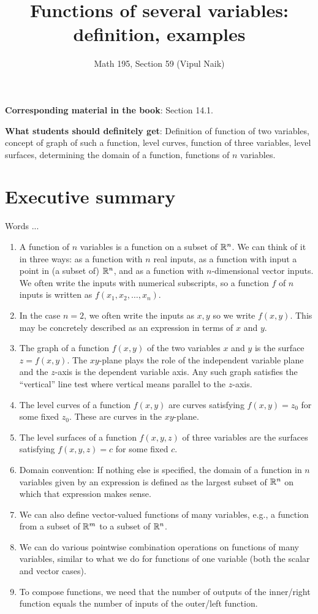 \documentclass[10pt]{amsart}
\title{Functions of several variables: definition, examples}
\author{Math 195, Section 59 (Vipul Naik)}
\begin{document}
\maketitle

{\bf Corresponding material in the book}: Section 14.1.

{\bf What students should definitely get}: Definition of function of
two variables, concept of graph of such a function, level curves,
function of three variables, level surfaces, determining the domain of
a function, functions of $n$ variables.

\section*{Executive summary}

Words ...

\begin{enumerate}
\item A function of $n$ variables is a function on a subset of
  $\mathbb{R}^n$. We can think of it in three ways: as a function with $n$
  real inputs, as a function with input a point in (a subset of)
  $\mathbb{R}^n$, and as a function with $n$-dimensional vector inputs. We
  often write the inputs with numerical subscripts, so a function $f$
  of $n$ inputs is written as $f(x_1,x_2,\dots,x_n)$.
\item In the case $n = 2$, we often write the inputs as $x,y$ so we
  write $f(x,y)$. This may be concretely described as an expression in
  terms of $x$ and $y$.
\item The graph of a function $f(x,y)$ of the two variables $x$ and
  $y$ is the surface $z = f(x,y)$. The $xy$-plane plays the role of
  the independent variable plane and the $z$-axis is the dependent
  variable axis. Any such graph satisfies the ``vertical'' line test
  where vertical means parallel to the $z$-axis.
\item The level curves of a function $f(x,y)$ are curves satisfying
  $f(x,y) = z_0$ for some fixed $z_0$. These are curves in the
  $xy$-plane.
\item The level surfaces of a function $f(x,y,z)$ of three variables
  are the surfaces satisfying $f(x,y,z) = c$ for some fixed $c$.
\item Domain convention: If nothing else is specified, the domain of a
  function in $n$ variables given by an expression is defined as the
  largest subset of $\mathbb{R}^n$ on which that expression makes sense.
\item We can also define vector-valued functions of many variables,
  e.g., a function from a subset of $\mathbb{R}^m$ to a subset of $\mathbb{R}^n$.
\item We can do various pointwise combination operations on functions
  of many variables, similar to what we do for functions of one variable
  (both the scalar and vector cases).
\item To compose functions, we need that the number of outputs of the
  inner/right function equals the number of inputs of the outer/left
  function.
\end{enumerate}
\end{document}

